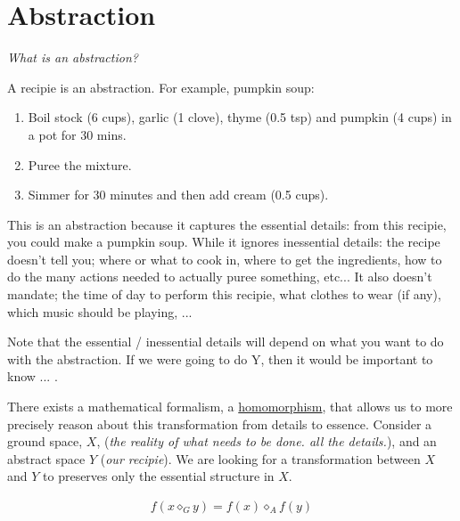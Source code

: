 \chapter{Abstraction}\label{C:abstraction}


\begin{displayquote}
 \textit{What is an abstraction?}
\end{displayquote}

A recipie is an abstraction. For example, pumpkin soup:

\begin{enumerate}
\tightlist
\item Boil stock (6 cups), garlic (1 clove), thyme (0.5 tsp) and pumpkin (4 cups) in a pot for 30 mins.
\item Puree the mixture.
\item Simmer for 30 minutes and then add cream (0.5 cups).
\end{enumerate}

This is an abstraction because it captures the essential details: from this recipie, you could make a pumpkin soup.
While it ignores inessential details: the recipe doesn't tell you; where or what to cook in, where to get the
ingredients, how to do the many actions needed to actually puree something, etc...
It also doesn't mandate; the time of day to perform this recipie, what clothes to wear (if any),
which music should be playing, ...

Note that the essential / inessential details will depend on what you want to do with the abstraction.
If we were going to do Y, then it would be important to know ... .

\vspace{5mm}

There exists a mathematical formalism, a  \href{https://en.wikipedia.org/wiki/Homomorphism}{homomorphism},
that allows us to more precisely reason about this transformation from
details to essence. Consider a ground space, $X$, (\textit{the reality of what
needs to be done. all the details.}), and an abstract space $Y$ (\textit{our recipie}).
We are looking for a transformation between $X$ and $Y$ to preserves only the essential
structure in $X$.


\begin{align*}
f(x \diamond_G y) = f(x) \diamond_A f(y)
\end{align*}

